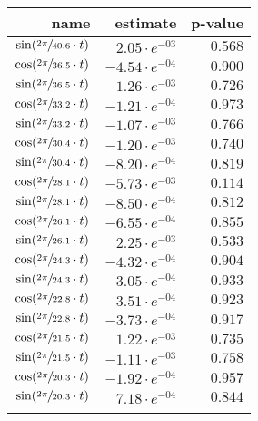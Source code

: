 \begin{tabular}{r|rr}
\hline
 name                               & estimate              & p-value   \\
\hline
 $\sin(\sfrac{2\pi}{40.6} \cdot t)$ & $2.05 \cdot e^{-03}$  & $0.568$   \\
 $\cos(\sfrac{2\pi}{36.5} \cdot t)$ & $-4.54 \cdot e^{-04}$ & $0.900$   \\
 $\sin(\sfrac{2\pi}{36.5} \cdot t)$ & $-1.26 \cdot e^{-03}$ & $0.726$   \\
 $\cos(\sfrac{2\pi}{33.2} \cdot t)$ & $-1.21 \cdot e^{-04}$ & $0.973$   \\
 $\sin(\sfrac{2\pi}{33.2} \cdot t)$ & $-1.07 \cdot e^{-03}$ & $0.766$   \\
 $\cos(\sfrac{2\pi}{30.4} \cdot t)$ & $-1.20 \cdot e^{-03}$ & $0.740$   \\
 $\sin(\sfrac{2\pi}{30.4} \cdot t)$ & $-8.20 \cdot e^{-04}$ & $0.819$   \\
 $\cos(\sfrac{2\pi}{28.1} \cdot t)$ & $-5.73 \cdot e^{-03}$ & $0.114$   \\
 $\sin(\sfrac{2\pi}{28.1} \cdot t)$ & $-8.50 \cdot e^{-04}$ & $0.812$   \\
 $\cos(\sfrac{2\pi}{26.1} \cdot t)$ & $-6.55 \cdot e^{-04}$ & $0.855$   \\
 $\sin(\sfrac{2\pi}{26.1} \cdot t)$ & $2.25 \cdot e^{-03}$  & $0.533$   \\
 $\cos(\sfrac{2\pi}{24.3} \cdot t)$ & $-4.32 \cdot e^{-04}$ & $0.904$   \\
 $\sin(\sfrac{2\pi}{24.3} \cdot t)$ & $3.05 \cdot e^{-04}$  & $0.933$   \\
 $\cos(\sfrac{2\pi}{22.8} \cdot t)$ & $3.51 \cdot e^{-04}$  & $0.923$   \\
 $\sin(\sfrac{2\pi}{22.8} \cdot t)$ & $-3.73 \cdot e^{-04}$ & $0.917$   \\
 $\cos(\sfrac{2\pi}{21.5} \cdot t)$ & $1.22 \cdot e^{-03}$  & $0.735$   \\
 $\sin(\sfrac{2\pi}{21.5} \cdot t)$ & $-1.11 \cdot e^{-03}$ & $0.758$   \\
 $\cos(\sfrac{2\pi}{20.3} \cdot t)$ & $-1.92 \cdot e^{-04}$ & $0.957$   \\
 $\sin(\sfrac{2\pi}{20.3} \cdot t)$ & $7.18 \cdot e^{-04}$  & $0.844$   \\
                                    &                       &           \\
\hline
\end{tabular}
